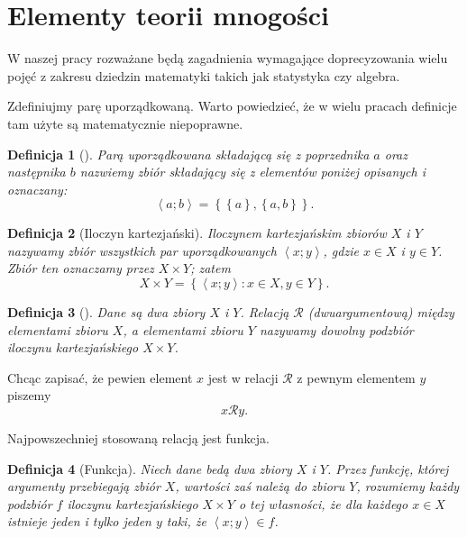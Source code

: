 \documentclass[12pt,a4paper]{report}
\newtheorem{definition}{Definicja}[chapter]
\newcommand{\parauporzadkowana}[2]{\left\langle {#1}; {#2} \right\rangle}
\newcommand{\zbior}[1]{\left\lbrace {#1} \right\rbrace }
\begin{document}
\section{Elementy teorii mnogości}
W naszej pracy rozważane będą zagadnienia wymagające doprecyzowania wielu pojęć z zakresu dziedzin matematyki takich jak statystyka czy algebra. 


Zdefiniujmy parę uporządkowaną. Warto powiedzieć, że w wielu pracach definicje tam użyte są matematycznie niepoprawne.

\begin{definition}[{\citep[Sec 3.3]{kuratowski1966wstkep}}]
Parą uporządkowana składającą się z poprzednika $a$ oraz następnika $b$ nazwiemy zbiór składający się z elementów poniżej opisanych i oznaczany:
\begin{equation*}
\parauporzadkowana{a}{b}=\zbior{\zbior{a}, \zbior{a,b}}.
\end{equation*}

\end{definition}

\begin{definition}[Iloczyn kartezjański{\citep[Sec 3.4]{kuratowski1966wstkep}}]
Iloczynem kartezjańskim zbiorów $X$ i $Y$ nazywamy zbiór wszystkich par uporządkowanych $\parauporzadkowana{x}{y}$, gdzie $x \in X$ i $y \in Y$. Zbiór ten oznaczamy przez $ X \times Y$; zatem
\begin{equation*}
X \times Y= \zbior{\parauporzadkowana{x}{y}:  x\in X  , y \in Y}.
\end{equation*} 

\end{definition}

\begin{definition}[{\citep[Sec 6.1]{kraszewski2007wstkep}}]
Dane są dwa zbiory $X$ i $Y$. Relacją $\mathcal{R}$ (dwuargumentową) między elementami zbioru $X$, a elementami zbioru $Y$ nazywamy dowolny podzbiór iloczynu kartezjańskiego $X \times Y$.
\end{definition}
Chcąc zapisać, że pewien element $x$ jest w relacji $\mathcal{R}$ z pewnym elementem $y$ piszemy
$$
x\mathcal{R}y.
$$

Najpowszechniej stosowaną relacją jest funkcja.

\begin{definition}[Funkcja{\citep[Sec 4.1]{kuratowski1966wstkep}}]
Niech dane bedą dwa zbiory $X$ i $Y$. Przez funkcję, której argumenty przebiegają zbiór $X$, wartości zaś należą do zbioru $Y$, rozumiemy każdy podzbiór $f$ iloczynu kartezjańskiego $X \times Y$ o tej własności, że dla każdego $x \in X$ istnieje jeden i tylko jeden $y$ taki, że $\parauporzadkowana{x}{y} \in f$. 

\end{definition}
\end{document}
